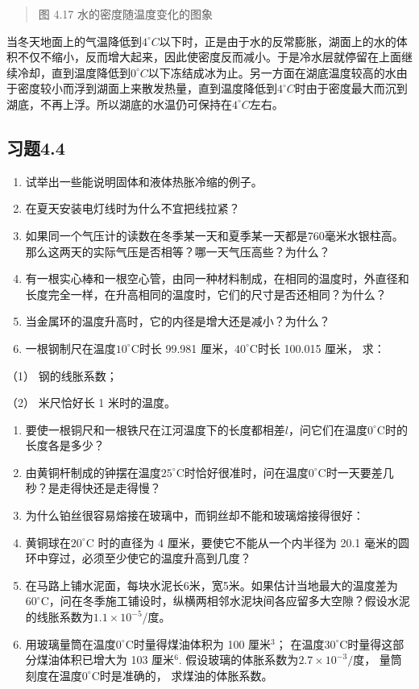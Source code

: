 \begin{quote}
图 4.17 水的密度随温度变化的图象
\end{quote}

当冬天地面上的气温降低到\(4^{\circ}C\)以下时，正是由于水的反常膨胀，湖面上的水的体积不仅不缩小，反而增大起来，因此使密度反而减小。于是冷水层就停留在上面继续冷却，直到温度降低到\(0^{\circ}C\)以下冻结成冰为止。另一方面在湖底温度较高的水由于密度较小而浮到湖面上来散发热量，直到温度降低到\(4^{\circ}C\)时由于密度最大而沉到湖底，不再上浮。所以湖底的水温仍可保持在\(4^{\circ}C\)左右。

\subsection{习题4.4}\label{ux4e60ux98984.4}

\begin{enumerate}
\def\labelenumi{\arabic{enumi}.}
\item
  试举出一些能说明固体和液体热胀冷缩的例子。
\item
  在夏天安装电灯线时为什么不宜把线拉紧？
\item
  如果同一个气压计的读数在冬季某一天和夏季某一天都是760毫米水银柱高。那么这两天的实际气压是否相等？哪一天气压高些？为什么？
\item
  有一根实心棒和一根空心管，由同一种材料制成，在相同的温度时，外直径和长度完全一样，在升高相同的温度时，它们的尺寸是否还相同？为什么？
\item
  当金属环的温度升高时，它的内径是增大还是减小？为什么？
\item
  一根钢制尺在温度\(10^{\circ} \mathrm{C}\)时长 99.981
  厘米，\(40^{\circ} \mathrm{C}\)时长 100.015 厘米， 求：
\end{enumerate}

（1） 钢的线胀系数；

（2） 米尺恰好长 1 米时的温度。

\begin{enumerate}
\def\labelenumi{\arabic{enumi}.}
\setcounter{enumi}{6}
\item
  要使一根铜尺和一根铁尺在江河温度下的长度都相差\(l\)，问它们在温度\(0^{\circ} \mathrm{C}\)时的长度各是多少？
\item
  由黄铜杆制成的钟摆在温度\(25^{\circ} \mathrm{C}\)时恰好很准时，问在温度\(0^{\circ} \mathrm{C}\)时一天要差几秒？是走得快还是走得慢？
\item
  为什么铂丝很容易熔接在玻璃中，而铜丝却不能和玻璃熔接得很好：
\item
  黄铜球在\(20^{\circ}\)C 时的直径为 4 厘米，要使它不能从一个内半径为
  20.1 毫米的圆环中穿过，必须至少使它的温度升高到几度？
\item
  在马路上铺水泥面，每块水泥长6米，宽5米。如果估计当地最大的温度差为\(60^{\circ}\mathrm{C}\)，问在冬季施工铺设时，纵横两相邻水泥块间各应留多大空隙？假设水泥的线胀系数为\(1.1 \times 10^{-5}\)/度。
\item
  用玻璃量筒在温度\(0^{\circ} \mathrm{C}\)时量得煤油体积为 100
  厘米\(^{3}\)；
  在温度\(30^{\circ} \mathrm{C}\)时量得这部分煤油体积已增大为 103
  厘米\(^{6}\). 假设玻璃的体胀系数为\(2.7 \times 10^{-3} / \text{度}\)，
  量筒刻度在温度\(0^{\circ} \mathrm{C}\)时是准确的， 求煤油的体胀系数。
\end{enumerate}

